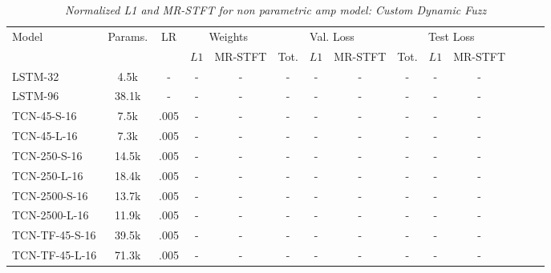 \setlength{\tabcolsep}{4pt}
\begin{table*}[h]
    \centering
    \small
    \caption{\textit{Normalized L1 and MR-STFT for non parametric amp model: Custom Dynamic Fuzz}}
    \begin{tabular}{lccccccccccccc}
        \toprule
        \multirow{2}{*}{Model}
            & \multirow{2}{*}{Params.}
                & \multirow{2}{*}{LR}
                    & \multicolumn{2}{c}{Weights}
                        & \multicolumn{3}{c}{Val. Loss}
                            & \multicolumn{3}{c}{Test Loss} \\ 
        \cmidrule(lr){4-5} 
            \cmidrule(lr){6-8} 
                \cmidrule(lr){9-11}
        &   &   & $L1$ & MR-STFT & Tot. & $L1$ & MR-STFT & Tot. & $L1$ & MR-STFT \\ 
        \midrule
        LSTM-32
            & 4.5k  & - & - & - & - & - & - & - & - & - & \\
        LSTM-96       
            & 38.1k & - & - & - & - & - & - & - & - & - & \\
        \midrule
        TCN-45-S-16               
            & 7.5k & .005 & - & - & - & - & - & - & - & - & \\ 
        TCN-45-L-16               
            & 7.3k & .005 & - & - & - & - & - & - & - & -  \\
        TCN-250-S-16               
            & 14.5k & .005 & - & - & - & - & - & - & - & - \\ 
        TCN-250-L-16               
            & 18.4k & .005 & - & - & - & - & - & - & - & - \\
        TCN-2500-S-16               
            & 13.7k & .005 & - & - & - & - & - & - & - & - \\ 
        TCN-2500-L-16               
            & 11.9k & .005 & - & - & - & - & - & - & - & - \\
        \midrule
        TCN-TF-45-S-16               
            & 39.5k & .005 & - & - & - & - & - & - & - & - \\
        TCN-TF-45-L-16               
            & 71.3k & .005 & - & - & - & - & - & - & - & - \\

\end{tabular}
\end{table*}
